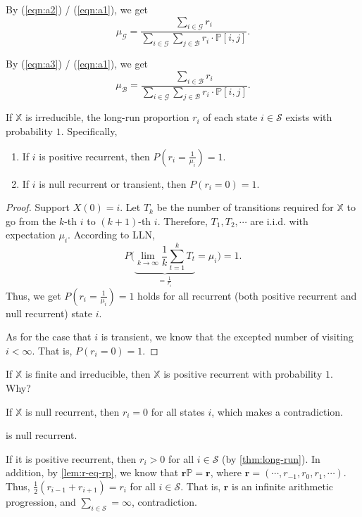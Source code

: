 \begin{example}
\begin{description}
    By (\ref{eqn:a2}) / (\ref{eqn:a1}), we get
    \[ \mu_{\mathcal{G}} = \frac{\sum_{i \in \mathcal{G}} r_{i}}{\sum_{i \in \mathcal{G}} \sum_{j \in \mathcal{B}} r_{i} \cdot \mathbb{P}[i, j]}. \]

    By (\ref{eqn:a3}) / (\ref{eqn:a1}), we get
    \[ \mu_{\mathcal{B}} = \frac{\sum_{i \in \mathcal{B}} r_{i}}{\sum_{i \in \mathcal{G}} \sum_{j \in \mathcal{B}} r_{i} \cdot \mathbb{P}[i, j]}. \]
\end{description}
\end{example}

\begin{theorem} \label{thm:long-run}
If $ \mathbb{X} $ is irreducible, the long-run proportion $ r_{i} $ of each state $ i \in \mathcal{S} $ exists with probability $ 1 $. Specifically,
\begin{enumerate}
  \item If $ i $ is positive recurrent, then $ P \left( r_{i} = \frac{1}{\mu_{i}} \right) = 1 $.
  \item If $ i $ is null recurrent or transient, then $ P(r_{i} = 0) = 1 $.
\end{enumerate}

\begin{proof}
Support $ X(0) = i $. Let $ T_{k} $ be the number of transitions required for $ \mathbb{X} $ to go from the $ k $-th $ i $ to $ (k + 1) $-th $ i $. Therefore, $ T_{1}, T_{2}, \cdots $ are i.i.d. with expectation $ \mu_{i} $. According to LLN,
\[ P \Bigg( \underbrace{\lim_{k \to \infty} \frac{1}{k} \sum_{t = 1}^{k} T_{t}}_{= \frac{1}{r_{i}}} = \mu_{i} \Bigg) = 1. \]
Thus, we get $ P \left( r_{i} = \frac{1}{\mu_{i}} \right) = 1 $ holds for all recurrent (both positive recurrent and null recurrent) state $ i $.

As for the case that $ i $ is transient, we know that the excepted number of visiting $ i < \infty $. That is, $ P(r_{i} = 0) = 1 $.
\end{proof}
\end{theorem}

\begin{example}
If $ \mathbb{X} $ is finite and irreducible, then $ \mathbb{X} $ is positive recurrent with probability $ 1 $. Why?

If $ \mathbb{X} $ is null recurrent, then $ r_{i} = 0 $ for all states $ i $, which makes a contradiction.
\end{example}

\begin{example}
 is null recurrent.

If it is positive recurrent, then $ r_{i} > 0 $ for all $ i \in \mathcal{S} $ (by \autoref{thm:long-run}).
In addition, by \autoref{lem:r-eq-rp}, we know that $ \mathbf{r}\mathbb{P} = \mathbf{r} $, where $ \mathbf{r} = (\cdots, r_{-1}, r_{0}, r_{1}, \cdots) $. Thus, $ \frac{1}{2} (r_{i - 1} + r_{i + 1}) = r_{i} $ for all $ i \in \mathcal{S} $. That is, $ \mathbf{r} $ is an infinite arithmetic progression, and $ \sum_{i \in \mathcal{S}} = \infty $, contradiction.
\end{example}

